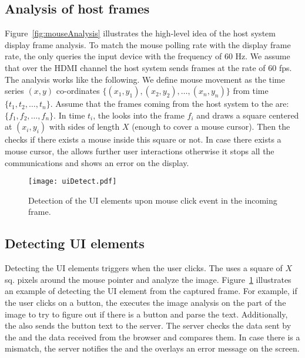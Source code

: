 
\subsection{Analysis of host frames}
\label{sec:systemnDesign:analysis}

Figure~\ref{fig:mouseAnalysis} illustrates the high-level idea of the host system display frame analysis. To match the mouse polling rate with the display frame rate, the \device only queries the input device with the frequency of $60$ Hz. We assume that over the HDMI channel the host system sends frames at the rate of $60$ fps. The analysis works like the following. We define mouse movement as the time series $(x,y)$ co-ordinates $\{(x_1,y_1), (x_2, y_2), \ldots, (x_n,y_n)\}$ from time $\{t_1, t_2, \ldots, t_n\}$. Assume that the frames coming from the host system to the \device are: $\{f_1, f_2, \ldots, f_n\}$. In time $t_i$, the \device looks into the frame $f_i$ and draws a square centered at $(x_i, y_i)$ with sides of length $X$ (enough to cover a mouse cursor). Then the \device checks if there exists a mouse inside this square or not. In case there exists a mouse cursor, the \device allows further user interactions otherwise it stops all the communications and shows an error on the display.

\begin{figure}[t]
\centering
\texttt{[image: uiDetect.pdf]}
\caption{Detection of the UI elements upon mouse click event in the incoming frame.}
\label{fig:uiDetect}
\centering
\end{figure}


\subsection{Detecting UI elements}
\label{sec:systemnDesign:uiElements}

Detecting the UI elements triggers when the user clicks. The \device uses a square of $X$ sq. pixels around the mouse pointer and analyze the image. Figure~\ref{fig:uiDetect} illustrates an example of detecting the UI element from the captured frame. For example, if the user clicks on a button, the \device executes the image analysis on the part of the image to try to figure out if there is a button and parse the text. Additionally, the \device also sends the button text to the server. The server checks the data sent by the \device and the data received from the browser and compares them. In case there is a mismatch, the server notifies the \device and the \device overlays an error message on the screen. 


